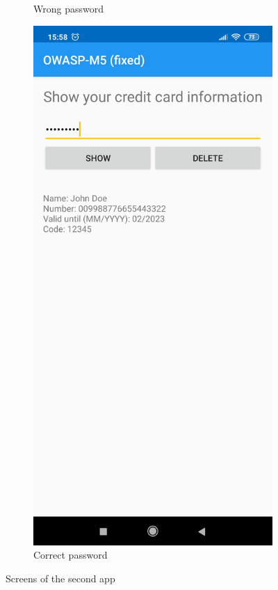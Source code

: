 \begin{figure}[htb!]
\begin{subfigure}{.3\textwidth}
  		\caption{Wrong password}
	\end{subfigure}
	\begin{subfigure}{.3\textwidth}
  		\centering
  		\includegraphics[width=\linewidth]{imgs/secure_mobile_programming/app1_credit_card_info_shown.jpg}
  		\caption{Correct password}
	\end{subfigure}
	\caption{Screens of the second app}
	\label{fig:app1}
\end{figure}


